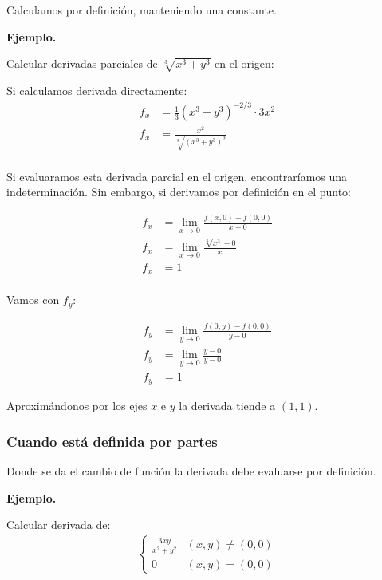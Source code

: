 Calculamos por definición,
manteniendo una constante.

\vspace{.5cm}
\textbf{Ejemplo.}

Calcular derivadas parciales de \(\sqrt[3]{x^{3} + y^{3}}\) en el origen:

Si calculamos derivada directamente:
\begin{align*}
    f_x & = \frac{1}{3}(x^{3} + y^{3})^{-2/3} \cdot 3x^{2} \\
    f_x & = \frac{x^{2}}{\sqrt[3]{(x^{3} + y^{3})^{2}}} \\
\end{align*}

Si evaluaramos esta derivada parcial en el origen,
encontraríamos una indeterminación.
Sin embargo, 
si derivamos por definición en el punto:

\begin{align*}
    f_x & = \lim_{x \to 0}\frac{f(x,0) - f(0,0)}{x - 0} \\
    f_x & = \lim_{x \to 0} \frac{\sqrt[3]{x^{3}} - 0}{x} \\
    f_x & = \boxed{1} \\
\end{align*}

Vamos con \(f_y\):

\begin{align*}
    f_y & = \lim_{y \to 0}\frac{f(0,y) - f(0,0)}{y - 0} \\
    f_y & = \lim_{y \to 0}\frac{y - 0}{y - 0} \\
    f_y & = \boxed{1}
\end{align*}

Aproximándonos por los ejes \(x\) e \(y\) la derivada tiende a \((1,1)\).


\subsubsection{Cuando está definida por partes}

Donde se da el cambio de función la derivada debe evaluarse por definición.

\vspace{.5cm}
\textbf{Ejemplo.}

Calcular derivada de:
\begin{align*}
    \begin{cases}
        \frac{3xy}{x^{2} + y^{2}} & (x,y)\neq (0,0) \\
        0 & (x,y) = (0,0)
    \end{cases}
\end{align*}

